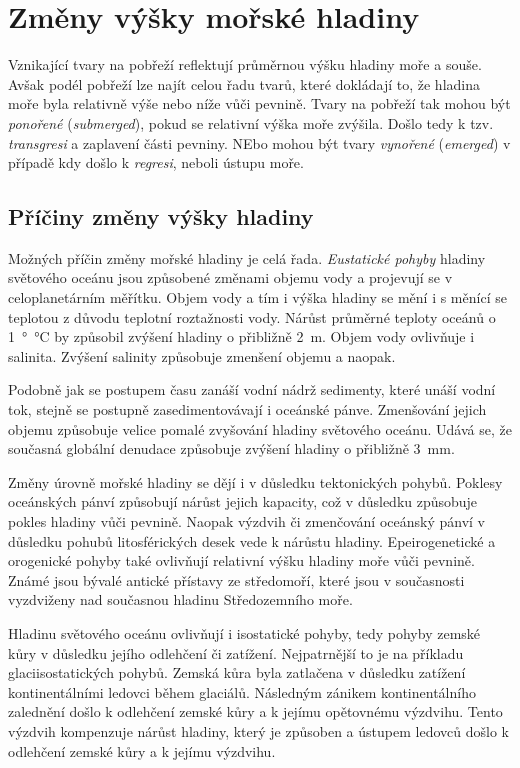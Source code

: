 \section{Změny výšky mořské hladiny}
Vznikající tvary na pobřeží reflektují průměrnou výšku hladiny moře a souše. Avšak podél pobřeží lze najít celou řadu tvarů, které dokládají to, že hladina moře byla relativně výše nebo níže vůči pevnině. Tvary na pobřeží tak mohou být \emph{ponořené} (\textit{submerged}), pokud se relativní výška moře zvýšila. Došlo tedy k tzv. \emph{transgresi} a zaplavení části pevniny. NEbo mohou být tvary \emph{vynořené} (\textit{emerged}) v případě kdy došlo k \emph{regresi}, neboli ústupu moře. 

\subsection{Příčiny změny výšky hladiny}
Možných příčin změny mořské hladiny je celá řada. \emph{Eustatické pohyby} hladiny světového oceánu jsou způsobené změnami objemu vody a projevují se v celoplanetárním měřítku. Objem vody a tím i výška hladiny se mění i s měnící se teplotou z důvodu teplotní roztažnosti vody. Nárůst průměrné teploty oceánů o \SI{1}{\degree\celsius} by způsobil zvýšení hladiny o přibližně \SI{2}{\metre}. Objem vody ovlivňuje i salinita. Zvýšení salinity způsobuje zmenšení objemu a naopak.

Podobně jak se postupem času zanáší vodní nádrž sedimenty, které unáší vodní tok, stejně se postupně zasedimentovávají i oceánské pánve. Zmenšování jejich objemu způsobuje velice pomalé zvyšování hladiny světového oceánu. Udává se, že současná globální denudace způsobuje zvýšení hladiny o přibližně \SI{3}{\milli\metre}.

Změny úrovně mořské hladiny se dějí i v důsledku tektonických pohybů. Poklesy oceánských pánví způsobují nárůst jejich kapacity, což v důsledku způsobuje pokles hladiny vůči pevnině. Naopak výzdvih či zmenčování oceánský pánví v důsledku pohubů litosférických desek vede k nárůstu hladiny.
Epeirogenetické a orogenické pohyby také ovlivňují relativní výšku hladiny moře vůči pevnině. Známé jsou bývalé antické přístavy ze středomoří, které jsou v současnosti vyzdviženy nad současnou hladinu Středozemního moře.

Hladinu světového oceánu ovlivňují i isostatické pohyby, tedy pohyby zemské kůry v důsledku jejího odlehčení či zatížení. Nejpatrnější to je na příkladu glaciisostatických pohybů. Zemská kůra byla zatlačena v důsledku zatížení kontinentálními ledovci během glaciálů. Následným zánikem kontinentálního zalednění došlo k odlehčení zemské kůry a k jejímu opětovnému výzdvihu. Tento výzdvih kompenzuje nárůst hladiny, který je způsoben  a ústupem ledovců došlo k odlehčení zemské kůry a k jejímu výzdvihu. 

